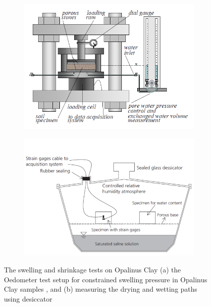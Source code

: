 \begin{figure}[!ht]
\begin{subfigure}[c]{0.48\textwidth}
\includegraphics[width=1\textwidth]{figures/Amir_Shrinkage_Swelling_Setup.png}
\subcaption{}
\label{fig:Amir_Shrinkage_Swelling_Setup}
\end{subfigure}
\hfill
\begin{subfigure}[c]{0.48\textwidth}
\includegraphics[width=1\textwidth]{figures/Amir_Shrinkage_Minardi.png}
\subcaption{}
\label{fig:Amir_Shrinkage_Minardi}
\end{subfigure}
\caption{The swelling and shrinkage tests on Opalinus Clay (a) the Oedometer test setup for constrained swelling pressure in Opalinus Clay samples \cite{Peronetal2009}, and (b) measuring the drying and wetting paths using desiccator \cite{Minardietal2016}}
\end{figure}

